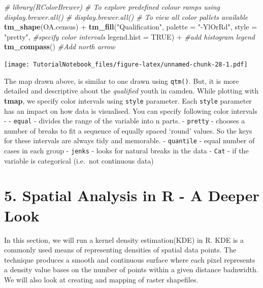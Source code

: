 \documentclass[]{article}
\newenvironment{Shaded}{}{}
\newcommand{\CommentTok}[1]{\textcolor[rgb]{0.38,0.63,0.69}{\textit{#1}}}
\newcommand{\DataTypeTok}[1]{\textcolor[rgb]{0.56,0.13,0.00}{#1}}
\newcommand{\KeywordTok}[1]{\textcolor[rgb]{0.00,0.44,0.13}{\textbf{#1}}}
\newcommand{\NormalTok}[1]{#1}
\newcommand{\OperatorTok}[1]{\textcolor[rgb]{0.40,0.40,0.40}{#1}}
\newcommand{\OtherTok}[1]{\textcolor[rgb]{0.00,0.44,0.13}{#1}}
\newcommand{\StringTok}[1]{\textcolor[rgb]{0.25,0.44,0.63}{#1}}
\begin{document}
\begin{Shaded}
\begin{Highlighting}[]
\CommentTok{# library(RColorBrewer) # To explore predefined colour ramps using display.brewer.all()}
\CommentTok{# display.brewer.all()  # To view all color pallets available}
\KeywordTok{tm_shape}\NormalTok{(OA.census) }\OperatorTok{+}\StringTok{ }\KeywordTok{tm_fill}\NormalTok{(}\StringTok{"Qualification"}\NormalTok{, }\DataTypeTok{palette =} \StringTok{"-YlOrRd"}\NormalTok{,}
                              \DataTypeTok{style =} \StringTok{"pretty"}\NormalTok{, }\CommentTok{#specify color intervals}
                              \DataTypeTok{legend.hist =} \OtherTok{TRUE}\NormalTok{) }\OperatorTok{+}\StringTok{ }\CommentTok{#add histogram legend}
\StringTok{  }\KeywordTok{tm_compass}\NormalTok{()  }\CommentTok{#Add north arrow}
\end{Highlighting}
\end{Shaded}

\texttt{[image: TutorialNotebook\_files/figure-latex/unnamed-chunk-28-1.pdf]}

The map drawn above, is similar to one drawn using \texttt{qtm()}. But,
it is more detailed and descriptive about the \emph{qualified} youth in
camden. While plotting with \textbf{tmap}, we specify color intervals
using \texttt{style} parameter. Each \texttt{style} parameter has an
impact on how data is visualised. You can specify following color
intervals - - \texttt{equal} - divides the range of the variable into n
parts. - \texttt{pretty} - chooses a number of breaks to fit a sequence
of equally spaced `round' values. So the keys for these intervals are
always tidy and memorable. - \texttt{quantile} - equal number of cases
in each group - \texttt{jenks} - looks for natural breaks in the data -
\texttt{Cat} - if the variable is categorical (i.e.~not continuous data)

\clearpage

\clearpage

\hypertarget{spatial-analysis-in-r---a-deeper-look}{%
\section{5. Spatial Analysis in R - A Deeper
Look}\label{spatial-analysis-in-r---a-deeper-look}}

In this section, we will run a kernel density estimation(KDE) in R. KDE
is a commonly used means of representing densities of spatial data
points. The technique produces a smooth and continuous surface where
each pixel represents a density value bases on the number of points
within a given distance badnwidth. We will also look at creating and
mapping of raster shapefiles.
\end{document}
